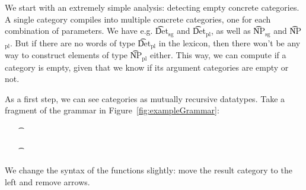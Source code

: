 We start with an extremely simple analysis: detecting empty concrete
categories. A single \gf{} category compiles into multiple concrete
categories, one for each combination of parameters. We have
e.g. \t{Det$_{\text{sg}}$} and \t{Det$_{\text{pl}}$}, as well as
\t{NP$_{\text{sg}}$} and \t{NP$_{\text{pl}}$}. But if there are no
words of type \t{Det$_{\text{pl}}$} in the lexicon, then there won't
be any way to construct elements of type \t{NP$_{\text{pl}}$}
either. This way, we can compute if a category is empty, given that we
know if its argument categories are empty or not.

As a first step, we can see \gf{} categories as mutually recursive
datatypes. Take a fragment of the \gf{} grammar in Figure~\ref{fig:exampleGrammar}:

\begin{itemize}
\item[\t{\OtherTok{cat}}]
\begin{Highlighting}[]
 \NormalTok{; } \NormalTok{; } \NormalTok{; } \NormalTok{; } \NormalTok{;}
\end{Highlighting}
\item[\t{\OtherTok{fun}}]\begin{Highlighting}[]
 \FunctionTok{:}  \OtherTok{->}  \OtherTok{->}  \NormalTok{;}
  \FunctionTok{:}   \OtherTok{->}  \OtherTok{->}  \NormalTok{;}
  \FunctionTok{:}   \OtherTok{->}  \OtherTok{->}  \NormalTok{;}
\FunctionTok{:}  \NormalTok{;}
\FunctionTok{:}  \NormalTok{;}
\FunctionTok{:} 
\end{Highlighting}
\end{itemize}

\noindent We change the syntax of the functions slightly: move the result
category to the left and remove arrows.

\begin{EmptyItem}
\begin{Highlighting}[]
  \OtherTok{::=}   \NormalTok{;}
   \OtherTok{::=}   \FunctionTok{|} \FunctionTok{|} 
   \OtherTok{::=}   \NormalTok{;}
  \OtherTok{::=} \FunctionTok{|} \FunctionTok{|} 
 \OtherTok{::=} \FunctionTok{|} 
\end{Highlighting}
\end{EmptyItem}


